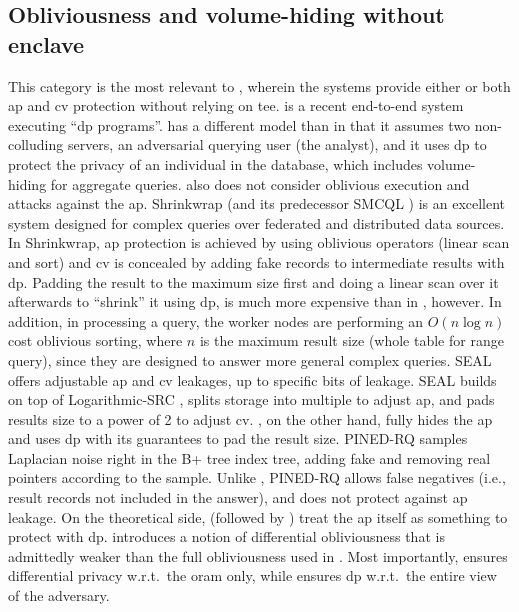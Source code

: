 		\subsection{Obliviousness and volume-hiding without enclave}

			This category is the most relevant to \epsolute{}, wherein the systems provide either or both \acrshort{ap} and \acrshort{cv} protection without relying on \acrshort{tee}.
			\crypte{} \cite{crypte} is a recent end-to-end system executing ``\acrshort{dp} programs''.
			\crypte{} has a different model than \epsolute{} in that it assumes two non-colluding servers, an adversarial querying user (the analyst), and it uses \acrshort{dp} to protect the privacy of an individual in the database, which includes volume-hiding for aggregate queries.
			\crypte{} also does not consider oblivious execution and attacks against the \acrshort{ap}.
			Shrinkwrap \cite{shrinkwrap} (and its predecessor SMCQL \cite{smcql}) is an excellent system designed for complex queries over federated and distributed data sources.
			In Shrinkwrap, \acrshort{ap} protection is achieved by using oblivious operators (linear scan and sort) and \acrshort{cv} is concealed by adding fake records to intermediate results with \acrshort{dp}.
			Padding the result to the maximum size first and doing a linear scan over it afterwards to ``shrink'' it using \acrshort{dp}, is much more expensive than in \epsolute{}, however.
			In addition, in processing a query, the worker nodes are performing an $O(n \log{n})$ cost oblivious sorting, where $n$ is the maximum result size (whole table for range query), since they are designed to answer more general complex queries.
			SEAL \cite{seal} offers adjustable \acrshort{ap} and \acrshort{cv} leakages, up to specific bits of leakage.
			SEAL builds on top of Logarithmic-SRC \cite{practical-range-search}, splits storage into multiple  to adjust \acrshort{ap}, and pads results size to a power of 2 to adjust \acrshort{cv}.
			\epsolute{}, on the other hand, fully hides the \acrshort{ap} and uses \acrshort{dp} with its guarantees to pad the result size.
			PINED-RQ \cite{pined-rq} samples Laplacian noise right in the B+ tree index tree, adding fake and removing real pointers according to the sample.
			Unlike \epsolute{}, PINED-RQ allows false negatives (i.e., result records not included in the answer), and does not protect against \acrshort{ap} leakage.
			On the theoretical side, \textcite{differential-obliviousness} (followed by \textcite{differential-obliviousness-followup}) treat the \acrshort{ap} itself as something to protect with \acrshort{dp}.
			\cite{differential-obliviousness} introduces a notion of differential obliviousness that is admittedly weaker than the full obliviousness used in \epsolute{}. %
			Most importantly, \cite{differential-obliviousness} ensures differential privacy w.r.t.~the \acrshort{oram} only, while \epsolute{} ensures \acrshort{dp} w.r.t.~the entire view of the adversary. %

